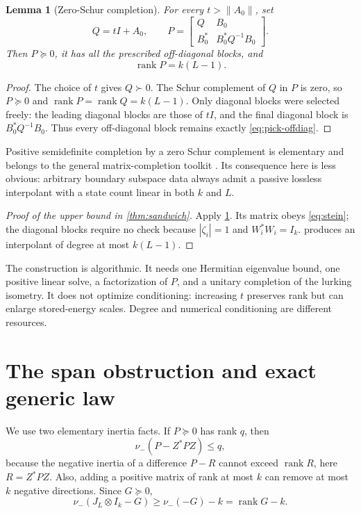 \documentclass[11pt]{article}
\newtheorem{lemma}[theorem]{Lemma}
\theoremstyle{definition}
\theoremstyle{remark}
\newcommand{\rank}{\operatorname{rank}}
\newcommand{\nminus}{\nu_{-}}
\newcommand{\norm}[1]{\lVert#1\rVert}
\begin{document}
\begin{lemma}[Zero-Schur completion]\label{lem:completion}
For every $t>\norm{A_0}$, set
\begin{equation}\label{eq:completion}
 Q=tI+A_0,
 \qquad
 P=\begin{bmatrix}
 Q&B_0\\ B_0^*&B_0^*Q^{-1}B_0
 \end{bmatrix}.
\end{equation}
Then $P\succeq0$, it has all the prescribed off-diagonal blocks, and
\[
                         \rank P=k(L-1).
\]
\end{lemma}

\begin{proof}
The choice of $t$ gives $Q\succ0$.  The Schur complement of $Q$ in $P$ is
zero, so $P\succeq0$ and $\rank P=\rank Q=k(L-1)$.  Only diagonal blocks
were selected freely: the leading diagonal blocks are those of $tI$, and
the final diagonal block is $B_0^*Q^{-1}B_0$.  Thus every off-diagonal block
remains exactly \eqref{eq:pick-offdiag}.
\end{proof}

Positive semidefinite completion by a zero Schur complement is elementary
and belongs to the general matrix-completion toolkit
\cite{Dancis1992}.  Its consequence here is less
obvious: arbitrary boundary subspace data always admit a passive lossless
interpolant with a state count linear in both $k$ and $L$.

\begin{proof}[Proof of the upper bound in \cref{thm:sandwich}]
Apply \cref{lem:completion}.  Its matrix obeys \eqref{eq:stein}; the diagonal
blocks require no check because $|\zeta_i|=1$ and $W_i^*W_i=I_k$.
 produces an interpolant of degree at most $k(L-1)$.
\end{proof}

The construction is algorithmic.  It needs one Hermitian eigenvalue bound,
one positive linear solve, a factorization of $P$, and a unitary completion
of the lurking isometry.  It does not optimize conditioning: increasing $t$
preserves rank but can enlarge stored-energy scales.  Degree and numerical
conditioning are different resources.

\section{The span obstruction and exact generic law}\label{sec:lower}

We use two elementary inertia facts.  If $P\succeq0$ has rank $q$, then
\begin{equation}\label{eq:displacement-inertia}
                      \nminus(P-Z^*PZ)\le q,
\end{equation}
because the negative inertia of a difference $P-R$ cannot exceed
$\rank R$, here $R=Z^*PZ$.  Also, adding a positive matrix of rank at most
$k$ can remove at most $k$ negative directions.  Since $G\succeq0$,
\begin{equation}\label{eq:rank-inertia}
 \nminus(J_L\otimes I_k-G)
 \ge \nminus(-G)-k
 =\rank G-k.
\end{equation}
\end{document}
